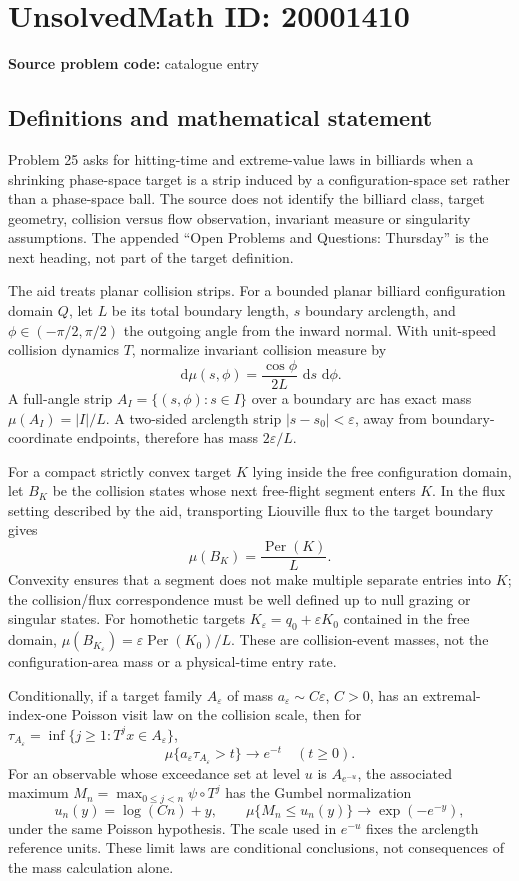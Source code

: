 \documentclass[11pt]{article}
\newcommand{\dd}{\,\mathrm{d}}
\begin{document}
\section*{UnsolvedMath ID: 20001410}
\textbf{Source problem code:} catalogue entry
\subsection{Definitions and mathematical statement}
Problem 25 asks for hitting-time and extreme-value laws in billiards when a shrinking phase-space target is a strip induced by a configuration-space set rather than a phase-space ball. The source does not identify the billiard class, target geometry, collision versus flow observation, invariant measure or singularity assumptions. The appended ``Open Problems and Questions: Thursday'' is the next heading, not part of the target definition.

The aid treats planar collision strips. For a bounded planar billiard configuration domain \(Q\), let \(L\) be its total boundary length, \(s\) boundary arclength, and \(\phi\in(-\pi/2,\pi/2)\) the outgoing angle from the inward normal. With unit-speed collision dynamics \(T\), normalize invariant collision measure by
\[
\dd\mu(s,\phi)=\frac{\cos\phi}{2L}\,\dd s\,\dd\phi.
\]
A full-angle strip \(A_I=\{(s,\phi):s\in I\}\) over a boundary arc has exact mass \(\mu(A_I)=|I|/L\). A two-sided arclength strip \(|s-s_0|<\varepsilon\), away from boundary-coordinate endpoints, therefore has mass \(2\varepsilon/L\).

For a compact strictly convex target \(K\) lying inside the free configuration domain, let \(B_K\) be the collision states whose next free-flight segment enters \(K\). In the flux setting described by the aid, transporting Liouville flux to the target boundary gives
\[
\mu(B_K)=\frac{\operatorname{Per}(K)}L.
\]
Convexity ensures that a segment does not make multiple separate entries into \(K\); the collision/flux correspondence must be well defined up to null grazing or singular states. For homothetic targets \(K_\varepsilon=q_0+\varepsilon K_0\) contained in the free domain, \(\mu(B_{K_\varepsilon})=\varepsilon\operatorname{Per}(K_0)/L\). These are collision-event masses, not the configuration-area mass or a physical-time entry rate.

Conditionally, if a target family \(A_\varepsilon\) of mass \(a_\varepsilon\sim C\varepsilon\), \(C>0\), has an extremal-index-one Poisson visit law on the collision scale, then for \(\tau_{A_\varepsilon}=\inf\{j\ge1:T^jx\in A_\varepsilon\}\),
\[
\mu\{a_\varepsilon\tau_{A_\varepsilon}>t\}\longrightarrow e^{-t}\quad(t\ge0).
\]
For an observable whose exceedance set at level \(u\) is \(A_{e^{-u}}\), the associated maximum \(M_n=\max_{0\le j<n}\psi\circ T^j\) has the Gumbel normalization
\[
u_n(y)=\log(Cn)+y,\qquad\mu\{M_n\le u_n(y)\}\longrightarrow\exp(-e^{-y}),
\]
under the same Poisson hypothesis. The scale used in \(e^{-u}\) fixes the arclength reference units. These limit laws are conditional conclusions, not consequences of the mass calculation alone.
\end{document}
